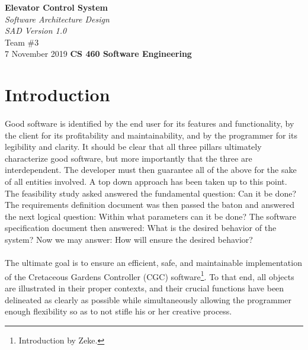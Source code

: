 \documentclass[12pt]{article}
\begin{document}
\begin{titlepage}
    \begin{flushleft}
        \vspace{1cm} \Huge  \textbf{Elevator Control System}\\
        \vspace{1cm} \Huge  \textit{Software Architecture Design}\\
        \vspace{1cm} \Large \textit{SAD Version 1.0}\\
        \vspace{5cm} \LARGE         Team \#3\\ 
                                    7 November 2019
        \vfill       \Huge  \textbf{CS 460 Software Engineering}
    \end{flushleft}
\end{titlepage}
\normalsize 
\tableofcontents
\pagebreak

\section{Introduction} \label{intro}
\paragraph{} Good software is identified by the end user for its features and functionality, by the client
for its profitability and maintainability, and by the programmer for its legibility and clarity. It should be clear
that all three pillars ultimately characterize good software, but more importantly that the three are interdependent.
The developer must then guarantee all of the above for the sake of all entities involved. A top down approach has been
taken up to this point. The feasibility study asked answered the fundamental question: Can it be done? The requirements
definition document was then passed the baton and answered the next logical question: Within what parameters can it be done?
The software specification document then answered: What is the desired behavior of the system? Now we may answer: 
How will ensure the desired behavior?

\paragraph{} The ultimate goal is to ensure an efficient, safe, and maintainable implementation of the Cretaceous Gardens Controller (CGC) software\footnote{Introduction by Zeke.}. To that end, all objects are illustrated in their proper contexts, and their crucial functions have been delineated as clearly as possible while simultaneously allowing the programmer enough flexibility so as to not stifle his or her creative process. 
\end{document}
